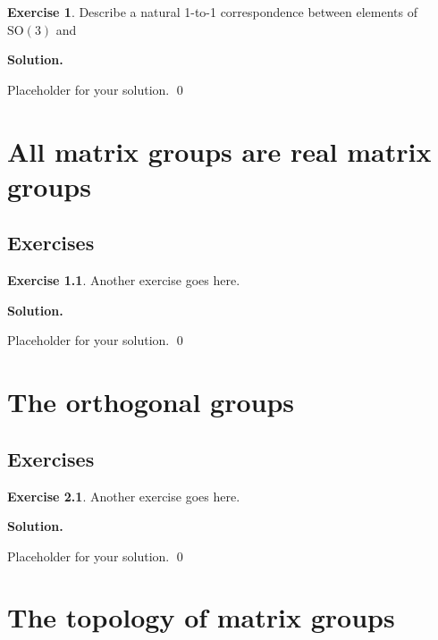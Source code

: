 \documentclass[12pt]{book}
\theoremstyle{definition}
\newtheorem{exercise}{Exercise}[chapter]
\newenvironment{solution}
{%
  \par\noindent\textbf{Solution.}\quad
}
{%
  \qed\par
}
\begin{document}
\begin{exercise}
Describe a natural 1-to-1 correspondence between elements of $\text{SO}(3)$ and 
\end{exercise}

\begin{solution}
Placeholder for your solution.
\end{solution}

\chapter{All matrix groups are real matrix groups}
\section{Exercises}

\begin{exercise}
Another exercise goes here.
\end{exercise}

\begin{solution}
Placeholder for your solution.
\end{solution}

\chapter{The orthogonal groups}
\section{Exercises}

\begin{exercise}
Another exercise goes here.
\end{exercise}

\begin{solution}
Placeholder for your solution.
\end{solution}

\chapter{The topology of matrix groups}
\end{document}
